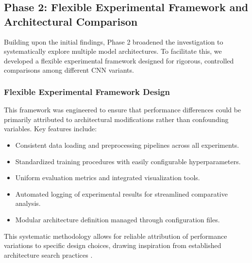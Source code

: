 
\subsection{Phase 2: Flexible Experimental Framework and Architectural Comparison}
Building upon the initial findings, Phase 2 broadened the investigation to systematically explore multiple model architectures. To facilitate this, we developed a flexible experimental framework designed for rigorous, controlled comparisons among different CNN variants.

\subsubsection{Flexible Experimental Framework Design}
This framework was engineered to ensure that performance differences could be primarily attributed to architectural modifications rather than confounding variables. Key features include:
\begin{itemize}
    \item Consistent data loading and preprocessing pipelines across all experiments.
    \item Standardized training procedures with easily configurable hyperparameters.
    \item Uniform evaluation metrics and integrated visualization tools.
    \item Automated logging of experimental results for streamlined comparative analysis.
    \item Modular architecture definition managed through configuration files.
\end{itemize}
This systematic methodology allows for reliable attribution of performance variations to specific design choices, drawing inspiration from established architecture search practices \cite{zoph2018learning, tan2019efficientnet}.

